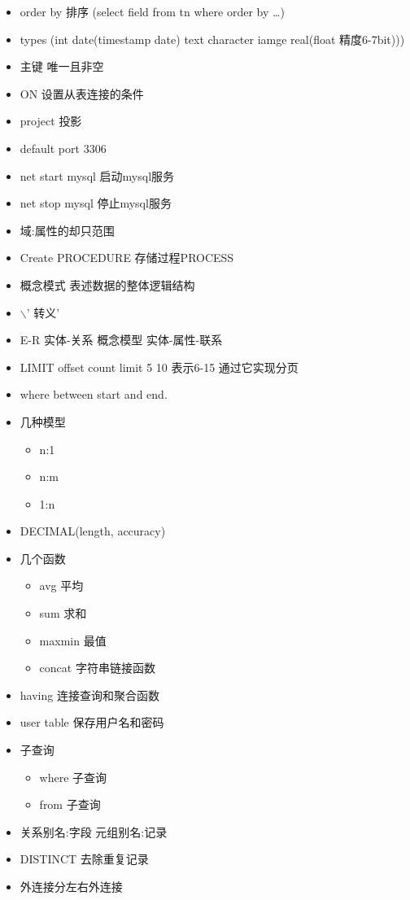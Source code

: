 \documentclass[11pt]{article}
\begin{document}
\begin{itemize}
\begin{itemize}
\item order by 排序  (select field from tn where order by \ldots{})
\item types    (int date(timestamp date) text character iamge real(float 精度6-7bit)))
\item 主键     唯一且非空
\item ON      设置从表连接的条件
\item project 投影
\item default port 3306
\item net start mysql 启动mysql服务
\item net stop  mysql 停止mysql服务
\item 域:属性的却只范围
\item Create PROCEDURE 存储过程PROCESS
\item 概念模式 表述数据的整体逻辑结构
\item $\backslash$'      转义'
\item E-R     实体-关系 概念模型 实体-属性-联系
\item LIMIT offset count  limit 5 10 表示6-15 通过它实现分页
\item where between start and end.
\item 几种模型
\begin{itemize}
\item n:1
\item n:m
\item 1:n
\end{itemize}
\item DECIMAL(length, accuracy)
\item 几个函数
\begin{itemize}
\item avg     平均
\item sum     求和
\item maxmin  最值
\item concat  字符串链接函数
\end{itemize}
\item having    连接查询和聚合函数
\item user table 保存用户名和密码
\item 子查询
\begin{itemize}
\item where 子查询
\item from  子查询
\end{itemize}
\item 关系别名:字段 元组别名:记录
\item DISTINCT 去除重复记录
\item 外连接分左右外连接

\end{itemize}
\end{itemize}
\end{document}
